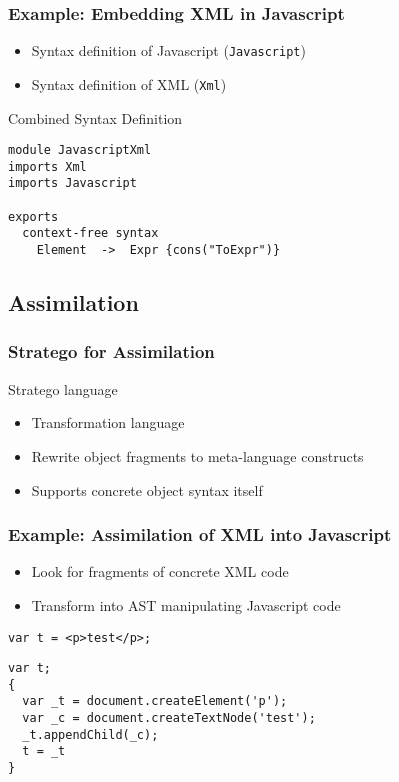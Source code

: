 \documentclass{beamer}
\begin{document}
\begin{frame}[fragile]

  \frametitle{Example: Embedding XML in Javascript}

  \begin{itemize}
    \item Syntax definition of Javascript (\texttt{Javascript})
    \item Syntax definition of XML (\texttt{Xml})
  \end{itemize}

    \begin{block}{Combined Syntax Definition}
      \begin{lstlisting}[language=SDF]
module JavascriptXml
imports Xml
imports Javascript

exports
  context-free syntax
    Element  ->  Expr {cons("ToExpr")}
      \end{lstlisting}
    \end{block}

\end{frame}


\subsection{Assimilation}

\begin{frame}

  \frametitle{Stratego for Assimilation}

  \begin{block}{Stratego language}
    \begin{itemize}
      \item Transformation language
      \item Rewrite object fragments to meta-language constructs
      \item Supports concrete object syntax itself
    \end{itemize}
  \end{block}

\end{frame}


\begin{frame}[fragile]

  \frametitle{Example: Assimilation of XML into Javascript}

  \begin{itemize}
    \item Look for fragments of concrete XML code
    \item Transform into AST manipulating Javascript code
  \end{itemize}

  \begin{lstlisting}
var t = <p>test</p>;
  \end{lstlisting}


  \begin{lstlisting}
var t;
{
  var _t = document.createElement('p');
  var _c = document.createTextNode('test');
  _t.appendChild(_c);
  t = _t
}
  \end{lstlisting}

\end{frame}
\end{document}

